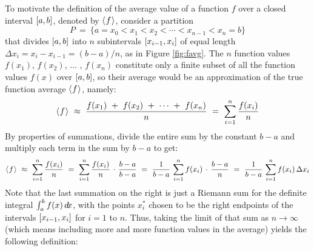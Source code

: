 To motivate the definition of the average value of a function $f$ over a closed
interval $\lbrack a,b \rbrack$, denoted by $\langle\mspace{1mu}f\mspace{1mu}\rangle$, consider a partition
\[
P ~=~ \lbrace a = x_0 < x_1 < x_2 < \cdots < x_{n-1} < x_n = b \rbrace
\]
that divides $\lbrack a,b \rbrack$ into $n$ subintervals
$\lbrack x_{i-1},x_i \rbrack$ of equal length $\Delta x_i = x_i-x_{i-1} = (b-a)/n$,
as in Figure \ref{fig:favg}. The $n$ function values $f(x_1)$, $f(x_2)$,
$\ldots$ , $f(x_n)$ constitute only a finite subset of all the function
values $f(x)$ over $\lbrack a,b \rbrack$, so their average would be an
approximation of the true function average $\langle\mspace{1mu}f\mspace{1mu}\rangle$, namely:
\[
\langle\mspace{1mu}f\mspace{1mu}\rangle ~\approx~ \frac{f(x_1) ~+~ f(x_2) ~+~ \cdots ~+~ f(x_n)}{n} ~=~
 \sum_{i=1}^n \frac{f(x_i)}{n}
\]
By properties of summations, divide the entire sum by the constant $b-a$ 
and multiply each term in the sum by $b-a$ to get:
\newpage
\[
\langle\mspace{1mu}f\mspace{1mu}\rangle ~\approx~ \sum_{i=1}^n \frac{f(x_i)}{n} ~=~ \sum_{i=1}^n \frac{f(x_i)}{n}\,\cdot\,\frac{b-a}{b-a} ~=~
\frac{1}{b-a}\,\sum_{i=1}^n f(x_i)\,\cdot\,\frac{b-a}{n} ~=~ \frac{1}{b-a}\,\sum_{i=1}^n f(x_i)\,\Delta x_i
\]
Note that the last summation on the right is just a Riemann sum for the
definite integral $\int_a^b f(x)\,d\!x$, with the points $x_i^*$ chosen to be the
right endpoints of the intervals $\lbrack x_{i-1},x_i \rbrack$ for $i=1$ to $n$. Thus,
taking the limit of that sum as $n \to \infty$ (which means including more and
more function values in the average) yields the following definition:

